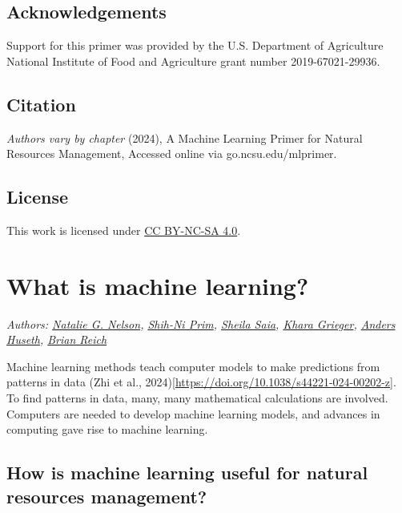 \documentclass[
]{book}
\begin{document}
\hypertarget{acknowledgements}{%
\section{Acknowledgements}\label{acknowledgements}}

Support for this primer was provided by the U.S. Department of Agriculture National Institute of Food and Agriculture grant number 2019-67021-29936.

\hypertarget{citation}{%
\section{Citation}\label{citation}}

\emph{Authors vary by chapter} (2024), A Machine Learning Primer for Natural Resources Management, Accessed online via go.ncsu.edu/mlprimer.

\hypertarget{license}{%
\section{License}\label{license}}

This work is licensed under \href{https://creativecommons.org/licenses/by-nc-sa/4.0/?ref=chooser-v1}{CC BY-NC-SA 4.0}.

\hypertarget{what-is-machine-learning}{%
\chapter{What is machine learning?}\label{what-is-machine-learning}}

\emph{Authors: \href{https://bae.ncsu.edu/people/nnelson4/}{Natalie G. Nelson}, \href{https://www.linkedin.com/in/shih-ni-prim-14033336/}{Shih-Ni Prim}, \href{https://sheilasaia.rbind.io/}{Sheila Saia}, \href{https://cals.ncsu.edu/applied-ecology/people/kdgriege/}{Khara Grieger}, \href{https://cals.ncsu.edu/entomology-and-plant-pathology/people/ashuseth/}{Anders Huseth}, \href{https://statistics.sciences.ncsu.edu/people/bjreich/}{Brian Reich}}

Machine learning methods teach computer models to make predictions from patterns in data (Zhi et al., 2024){[}\url{https://doi.org/10.1038/s44221-024-00202-z}{]}. To find patterns in data, many, many mathematical calculations are involved. Computers are needed to develop machine learning models, and advances in computing gave rise to machine learning.

\hypertarget{how-is-machine-learning-useful-for-natural-resources-management}{%
\section{How is machine learning useful for natural resources management?}\label{how-is-machine-learning-useful-for-natural-resources-management}}
\end{document}
